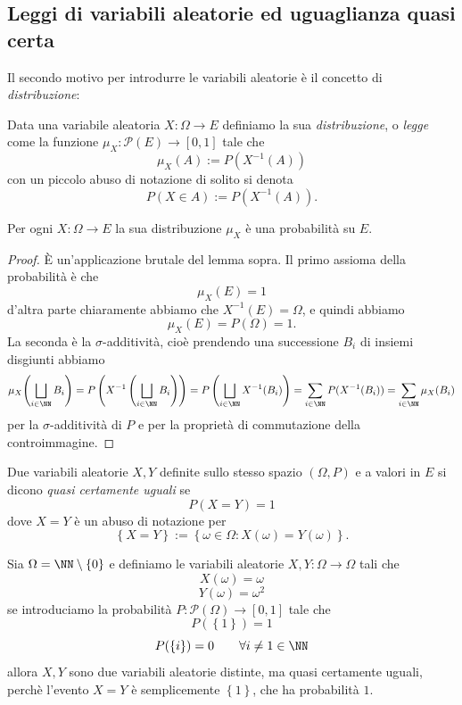 \documentclass[11pt]{scrartcl}
\newcommand{\parti}[1]{\mathcal{P}\!\left(#1\right)}
\begin{document}
	\subsection{Leggi di variabili aleatorie ed uguaglianza quasi certa}
	Il secondo motivo per introdurre le variabili aleatorie è il concetto di \textit{distribuzione}:
	\begin{definition}
		Data una variabile aleatoria $X:\Omega\to E$ definiamo la sua \textit{distribuzione}, o \textit{legge} come la funzione $\mu_X: \parti{E}\to [0,1]$ tale che
		$$\mu_X(A):=P(X^{-1}(A))$$
		con un piccolo abuso di notazione di solito si denota 
		$$P(X\in A):=P(X^{-1}(A)).$$
	\end{definition}
	\begin{proposition}
		Per ogni $X:\Omega\to E$ la sua distribuzione $\mu_X$ è una probabilità su $E$.
	\end{proposition}
	\begin{proof}
		\`E un'applicazione brutale del lemma sopra. Il primo assioma della probabilità è che
		$$\mu_X(E)=1$$
		d'altra parte chiaramente abbiamo che $X^{-1}(E)=\Omega$, e quindi abbiamo
		$$\mu_X(E)=P(\Omega)=1.$$
		La seconda è la $\sigma$-additività, cioè prendendo una successione $B_i$ di insiemi disgiunti abbiamo
		$$\mu_X\!\left(\bigsqcup_{i\in \NN}B_i\right)=P\left(X^{-1}\left(\bigsqcup_{i\in \NN}B_i\right)\right)=P\left(\bigsqcup_{i\in \NN}X^{-1}(B_i)\right)=\sum_{i\in\NN}P(X^{-1}(B_i))=\sum_{i\in\NN}\mu_X(B_i)$$
		per la $\sigma$-additività di $P$ e per la proprietà di commutazione della controimmagine.
	\end{proof}
	\begin{definition}
		Due variabili aleatorie $X,Y$ definite sullo stesso spazio $(\Omega,P)$ e a valori in $E$ si dicono \textit{quasi certamente uguali} se
		$$P(X=Y)=1$$
		dove $X=Y$ è un abuso di notazione per
		$$\left\{X=Y\right\}:=\left\{\omega\in \Omega:X(\omega)=Y(\omega)\right\}.$$
	\end{definition}
	\begin{example}
		Sia $\Omega=\NN\setminus\left\{0\right\}$ e definiamo le variabili aleatorie $X,Y:\Omega\to\Omega$ tali che
		$$X(\omega)=\omega$$
		$$Y(\omega)=\omega^2$$
		se introduciamo la probabilità $P:\parti{\Omega}\to [0,1]$ tale che 
		$$P(\left\{1\right\})=1$$
		$$P(\left\{i\right\})=0 \qquad \forall i\ne 1 \in \NN$$ 
		allora $X,Y$ sono due variabili aleatorie distinte, ma quasi certamente uguali, perchè l'evento $X=Y$ è semplicemente $\left\{1\right\}$, che ha probabilità $1$.
	\end{example}
\end{document}
